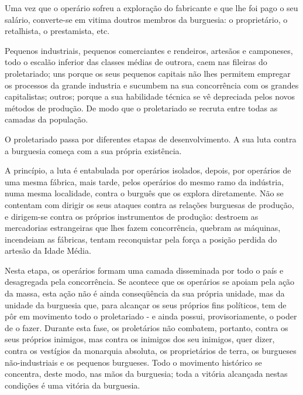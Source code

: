 Uma vez que o operário sofreu a exploração do fabricante e que lhe foi
pago o seu salário, converte-se em vitima doutros membros da
burguesia: o proprietário, o retalhista, o prestamista, etc.

Pequenos industriais, pequenos comerciantes e rendeiros, artesãos e
camponeses, todo o escalão inferior das classes médias de outrora,
caem nas fileiras do proletariado; uns porque os seus pequenos
capitais não lhes permitem empregar os processos da grande industria e
sucumbem na sua concorrência com os grandes capitalistas; outros;
porque a sua habilidade técnica se vê depreciada pelos novos métodos
de produção. De modo que o proletariado se recruta entre todas as
camadas da população.

O proletariado passa por diferentes etapas de desenvolvimento. A sua
luta contra a burguesia começa com a sua própria existência.

A princípio, a luta é entabulada por operários isolados, depois, por
operários de uma mesma fábrica, mais tarde, pelos operários do mesmo
ramo da indústria, numa mesma localidade, contra o burguês que os
explora diretamente. Não se contentam com dirigir os seus ataques
contra as relações burguesas de produção, e dirigem-se contra os
próprios instrumentos de produção: destroem as mercadorias
estrangeiras que lhes fazem concorrência, quebram as máquinas,
incendeiam as fábricas, tentam reconquistar pela força a posição
perdida do artesão da Idade Média.

Nesta etapa, os operários formam uma camada disseminada por todo o
país e desagregada pela concorrência. Se acontece que os operários se
apoiam pela ação da massa, esta ação não é ainda conseqüência da sua
própria unidade, mas da unidade da burguesia que, para alcançar os
seus próprios fins políticos, tem de pôr em movimento todo o
proletariado - e ainda possui, provisoriamente, o poder de o
fazer. Durante esta fase, os proletários não combatem, portanto,
contra os seus próprios inimigos, mas contra os inimigos dos seu
inimigos, quer dizer, contra os vestígios da monarquia absoluta, os
proprietários de terra, os burgueses não-industriais e os pequenos
burgueses. Todo o movimento histórico se concentra, deste modo, nas
mãos da burguesia; toda a vitória alcançada nestas condições é uma
vitória da burguesia.

